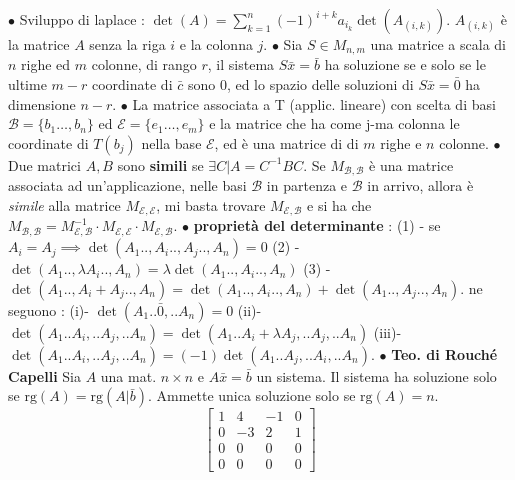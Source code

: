\documentclass[1pt, letterpaper]{article}
\newcommand{\E}{{\mathcal E}}
\newcommand{\B}{{\mathcal B}}
\newcommand{\rg}{{\text{rg}}}
\newcommand{\fdot}{{\(\bullet\) }}
\begin{document}
   
   \newpage
 \fdot Sviluppo di laplace : \(\det(A)=\displaystyle\sum_{k=1}^n(-1)^{i+k}a_{i_k}\det(A_{(i,k)})\). \(A_{(i,k)}\) è la matrice \(A\) senza la riga \(i\) e la colonna \(j\). \fdot Sia \(S\in M_{n,m}\) una matrice a 
   scala di \(n\) righe ed \(m\) colonne, di rango \(r\), il sistema \(S\bar x=\bar b\) ha soluzione se e solo se le ultime \(m-r\) coordinate di \(\bar c\) sono 0, ed lo spazio delle soluzioni di \(S\bar x = \bar 0\) ha 
   dimensione \(n-r\). \fdot La matrice associata a T (applic. lineare) con scelta di basi \(\B=\{b_1\dots,b_n\}\) ed \(\E=\{e_1\dots,e_m\}\) e la matrice che ha come j-ma colonna le coordinate di \(T(b_j)\) 
   nella base \(\E\), ed è una matrice di di \(m\) righe e \(n\) colonne. \fdot Due matrici \(A,B\) sono \textbf{simili} se  \(\exists C|A=C^{-1}BC\). Se \(M_{\B,\B}\) è una matrice associata ad un'applicazione, 
   nelle basi \(\B\) in partenza e \(\B\) in arrivo, allora è \textit{simile} alla matrice \(M_{\E,\E}\), mi basta trovare \(M_{\E,\B}\) e si ha che \(M_{\B,\B}=M_{\E,\B}^{-1}\cdot M_{\E,\E}\cdot M_{\E,\B}\).
   \fdot \textbf{proprietà del determinante} : 
   (1) - se \(A_i=A_j\implies\det(A_1..,A_i..,A_j..,A_n)=0\) (2) - \(\det(A_1..,\lambda A_i..,A_n)=\lambda\det(A_1.., A_i..,A_n)\) (3) - \(\det(A_1.., A_i+A_j..,A_n)=
   \det(A_1.., A_i..,A_n)+\det(A_1.., A_j..,A_n)\).
   ne seguono : (i)- 
   \(\det(A_1..\bar 0,.. A_n)=0\) (ii)- \(\det(A_1.. A_i,.. A_j,.. A_n)=\det(A_1.. A_i+\lambda A_j,.. A_j,.. A_n)\) (iii)- \(\det(A_1.. A_i,.. A_j,.. A_n)=(-1)\det(A_1.. A_j,.. A_i,.. A_n)\).
   \fdot \textbf{Teo. di Rouché Capelli} Sia \(A\) una mat. \(n\times n\) e \(A\bar x=\bar b\) un sistema. Il sistema ha soluzione solo se \(\rg(A)=\rg(A|\bar b)\). Ammette unica soluzione solo se \(\rg(A)=n\). 
   \newpage $$\begin{bmatrix}
    1&4&-1& 0\\ 0&-3&2&1\\ 0&0&0&0 \\ 0&0&0&0
    \end{bmatrix}$$
 
\end{document}
